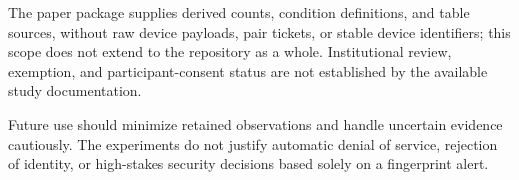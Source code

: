 The paper package supplies derived counts, condition definitions, and table sources, without raw device payloads, pair tickets, or stable device identifiers; this scope does not extend to the repository as a whole. Institutional review, exemption, and participant-consent status are not established by the available study documentation.

Future use should minimize retained observations and handle uncertain evidence cautiously. The experiments do not justify automatic denial of service, rejection of identity, or high-stakes security decisions based solely on a fingerprint alert.
